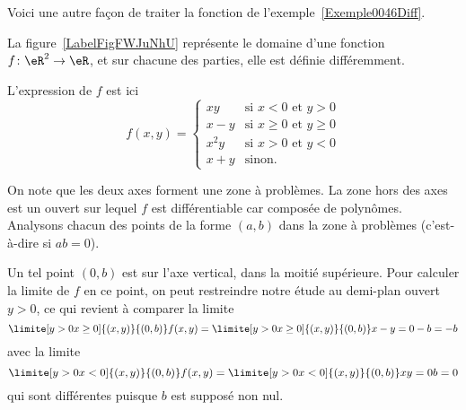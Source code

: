 \begin{example}
\end{example}

Voici une autre façon de traiter la fonction de l'exemple~\ref{Exemple0046Diff}.

\begin{example} \label{ExeFHmCLII}
	La figure~\ref{LabelFigFWJuNhU} représente le domaine d'une fonction \( f\colon \eR^2\to \eR\), et sur chacune des parties, elle est définie différemment.
	\newcommand{\CaptionFigFWJuNhU}{La fonction de l'exemple~\ref{ExeFHmCLII}.}
	

	L'expression de \( f\) est ici
	\begin{equation}
		f(x,y) =
		\begin{cases}
			xy   & \text{si } x < 0 \text{ et } y > 0       \\
			x-y  & \text{si } x \geq 0 \text{ et } y \geq 0 \\
			x^2y & \text{si } x > 0 \text{ et } y < 0       \\
			x+y  & \text{sinon.}
		\end{cases}
	\end{equation}

	On note que les deux axes forment une zone à problèmes. La zone hors
	des axes est un ouvert sur lequel \( f\) est différentiable car composée
	de polynômes. Analysons chacun des points de la forme \( (a,b)\) dans la
	zone à problèmes (c'est-à-dire si \( ab = 0\)).
	\begin{subproof}

		\spitem[Si \( a = 0\) et \( b > 0\)]
		Un tel point \( (0,b)\) est sur
		l'axe vertical, dans la moitié supérieure. Pour calculer la limite de
		\( f\) en ce point, on peut restreindre notre étude au demi-plan ouvert
		\( y > 0\), ce qui revient à comparer la limite
		\begin{equation*}
			\limite[y>0\\x\geq 0] {(x,y)} {(0,b)} f(x,y) =   \limite[y>0\\x\geq
				0] {(x,y)} {(0,b)} x-y = 0 - b = -b
		\end{equation*}
		avec la limite
		\begin{equation*}
			\limite[y>0\\x<0] {(x,y)} {(0,b)} f(x,y) =   \limite[y>0\\x<0]
			{(x,y)} {(0,b)} xy = 0 b = 0
		\end{equation*}
		qui sont différentes puisque \( b\) est supposé non nul.


\end{subproof}
\end{example}
